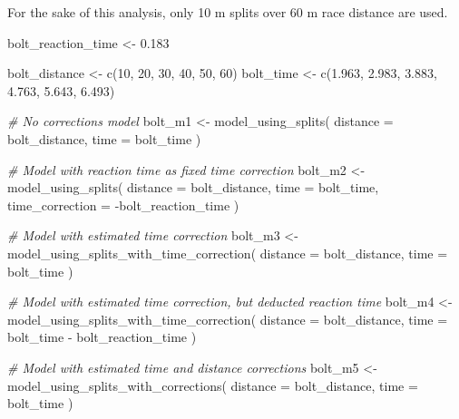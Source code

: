 \documentclass[fleqn,10pt,lineno]{wlpeerj} %
\newenvironment{Shaded}{\begin{snugshade}}{\end{snugshade}}
\newcommand{\AttributeTok}[1]{\textcolor[rgb]{0.77,0.63,0.00}{#1}}
\newcommand{\CommentTok}[1]{\textcolor[rgb]{0.56,0.35,0.01}{\textit{#1}}}
\newcommand{\DecValTok}[1]{\textcolor[rgb]{0.00,0.00,0.81}{#1}}
\newcommand{\FloatTok}[1]{\textcolor[rgb]{0.00,0.00,0.81}{#1}}
\newcommand{\FunctionTok}[1]{\textcolor[rgb]{0.00,0.00,0.00}{#1}}
\newcommand{\NormalTok}[1]{#1}
\newcommand{\OtherTok}[1]{\textcolor[rgb]{0.56,0.35,0.01}{#1}}
\newcommand{\SpecialCharTok}[1]{\textcolor[rgb]{0.00,0.00,0.00}{#1}}
\begin{document}
For the sake of this analysis, only 10 m splits over 60 m race distance are used.

\begin{Shaded}
\begin{Highlighting}[]
\NormalTok{bolt\_reaction\_time }\OtherTok{\textless{}{-}} \FloatTok{0.183}

\NormalTok{bolt\_distance }\OtherTok{\textless{}{-}} \FunctionTok{c}\NormalTok{(}\DecValTok{10}\NormalTok{, }\DecValTok{20}\NormalTok{, }\DecValTok{30}\NormalTok{, }\DecValTok{40}\NormalTok{, }\DecValTok{50}\NormalTok{, }\DecValTok{60}\NormalTok{)}
\NormalTok{bolt\_time }\OtherTok{\textless{}{-}} \FunctionTok{c}\NormalTok{(}\FloatTok{1.963}\NormalTok{, }\FloatTok{2.983}\NormalTok{, }\FloatTok{3.883}\NormalTok{, }\FloatTok{4.763}\NormalTok{, }\FloatTok{5.643}\NormalTok{, }\FloatTok{6.493}\NormalTok{)}

\CommentTok{\# No corrections model}
\NormalTok{bolt\_m1 }\OtherTok{\textless{}{-}} \FunctionTok{model\_using\_splits}\NormalTok{(}
  \AttributeTok{distance =}\NormalTok{ bolt\_distance,}
  \AttributeTok{time =}\NormalTok{ bolt\_time}
\NormalTok{)}

\CommentTok{\# Model with reaction time as fixed time correction}
\NormalTok{bolt\_m2 }\OtherTok{\textless{}{-}} \FunctionTok{model\_using\_splits}\NormalTok{(}
  \AttributeTok{distance =}\NormalTok{ bolt\_distance,}
  \AttributeTok{time =}\NormalTok{ bolt\_time,}
  \AttributeTok{time\_correction =} \SpecialCharTok{{-}}\NormalTok{bolt\_reaction\_time}
\NormalTok{)}

\CommentTok{\# Model with estimated time correction}
\NormalTok{bolt\_m3 }\OtherTok{\textless{}{-}} \FunctionTok{model\_using\_splits\_with\_time\_correction}\NormalTok{(}
  \AttributeTok{distance =}\NormalTok{ bolt\_distance,}
  \AttributeTok{time =}\NormalTok{ bolt\_time}
\NormalTok{)}

\CommentTok{\# Model with estimated time correction, but deducted reaction time}
\NormalTok{bolt\_m4 }\OtherTok{\textless{}{-}} \FunctionTok{model\_using\_splits\_with\_time\_correction}\NormalTok{(}
  \AttributeTok{distance =}\NormalTok{ bolt\_distance,}
  \AttributeTok{time =}\NormalTok{ bolt\_time }\SpecialCharTok{{-}}\NormalTok{ bolt\_reaction\_time}
\NormalTok{)}

\CommentTok{\# Model with estimated time and distance corrections}
\NormalTok{bolt\_m5 }\OtherTok{\textless{}{-}} \FunctionTok{model\_using\_splits\_with\_corrections}\NormalTok{(}
  \AttributeTok{distance =}\NormalTok{ bolt\_distance,}
  \AttributeTok{time =}\NormalTok{ bolt\_time}
\NormalTok{)}


\end{Highlighting}
\end{Shaded}
\end{document}
